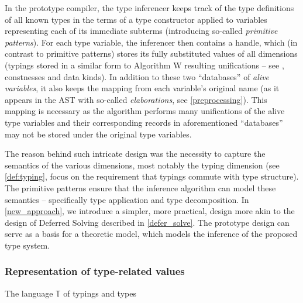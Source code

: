 In the prototype compiler, the type inferencer keeps track of the type definitions of all known types in the terms of a type constructor applied to variables representing each of its immediate subterms (introducing so-called \emph{primitive patterns}). For each type variable, the inferencer then contains a handle, which (in contrast to primitive patterns) stores its fully substituted values of all dimensions (typings stored in a similar form to Algorithm W resulting unifications -- see \cite{damas1982principal}, constnesses and data kinds). In addition to these two ``databases'' of \emph{alive variables}, it also keeps the mapping from each variable's original name (as it appears in the AST with so-called \emph{elaborations}, see \cref{preprocessing}). This mapping is necessary as the algorithm performs many unifications of the alive type variables and their corresponding records in aforementioned ``databases'' may not be stored under the original type variables.

The reason behind such intricate design was the necessity to capture the semantics of the various dimensions, most notably the typing dimension (see \cref{def:typing}, focus on the requirement that typings commute with type structure). The primitive patterns ensure that the inference algorithm can model these semantics -- specifically type application and type decomposition. In \cref{new_approach}, we introduce a simpler, more practical, design more akin to the design of Deferred Solving described in \cref{defer_solve}. The prototype design can serve as a basis for a theoretic model, which models the inference of the proposed type system.

\subsubsection{Representation of type-related values}

\label{def:tyvar}
\label{typing_gram}
\label{def:primpat}
\label{const_kind_def}
\label{def:properties}

\begin{lang}
  \def\grammarP{0.6}
  \begin{grammar}
  \end{grammar}
  \caption{The language $\mathbb{T}$ of typings and types}
  \label{lang:typing}
\end{lang}

